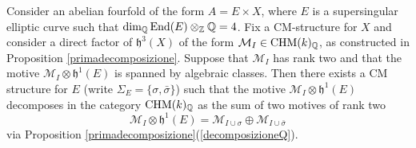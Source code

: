 \begin{lemma}
\notready\label{bellaidea}
Consider an abelian fourfold of the form $ A=E\times X$, where  $E$ is a supersingular elliptic curve such that $\dim_{\mathbb{Q}}\textnormal{End}(E)\otimes_{\mathbb{Z}} \mathbb{Q}=4$. Fix a CM-structure for $X$ and consider a direct factor of $\mathfrak{h}^3(X)$  of the form $\mathcal{M}_{I} \in\mathrm{CHM} (k)_{\mathbb{Q}}$, as constructed in Proposition \ref{primadecomposizione}. Suppose that $\mathcal{M}_{I} $ has rank two and that  the  motive ${\mathcal{M}_I \otimes \mathfrak{h}^1(E)}$ is spanned by algebraic classes. Then  there exists a CM structure for  $E$ (write $\Sigma_E=\{\sigma,\bar{\sigma}\}$) such that  the motive $\mathcal{M}_I \otimes \mathfrak{h}^1(E)$ decomposes in the category $\mathrm{CHM} (k)_{\mathbb{Q}}$ as the sum of two motives of rank two
\[\mathcal{M}_I \otimes \mathfrak{h}^1(E)= \mathcal{M}_{I\cup \sigma} \oplus \mathcal{M}_{I\cup \bar{\sigma}}\]
via Proposition  \ref{primadecomposizione}(\ref{decomposizioneQ}).
 \end{lemma}
